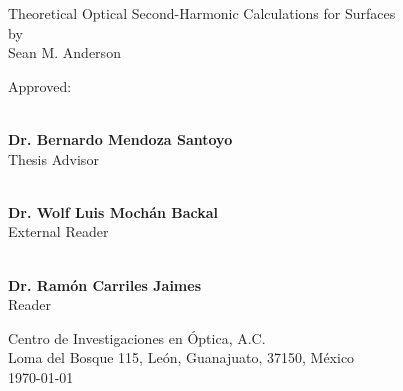 \begin{titlingpage*}

\begin{center}
    \vspace*{1cm}
    {\LARGE Theoretical Optical Second-Harmonic Calculations for Surfaces}\\
    \vspace{0.7cm}
    {\large by}\\
    \vspace{0.7cm}
    {\Large Sean M. Anderson}
\end{center}

\vfill
{\Large Approved:}

\begin{flushright}

\vspace*{1cm}

\makebox[0.5\textwidth ]{\hrulefill}\\
\textbf{Dr. Bernardo Mendoza Santoyo}\\ Thesis Advisor
\vspace{1.25cm}

\makebox[0.5\textwidth ]{\hrulefill}\\
\textbf{Dr. Wolf Luis Moch\'an Backal}\\ External Reader
\vspace{1.25cm}

\makebox[0.5\textwidth ]{\hrulefill}\\
\textbf{Dr. Ram\'on Carriles Jaimes}\\ Reader
\vfill

\end{flushright}

\begin{center}
    {\large 
    Centro de Investigaciones en \'Optica, A.C.\\
    Loma del Bosque 115, Le\'on, Guanajuato, 37150, M\'exico\\
    \today
    }
\end{center}

\end{titlingpage*}
